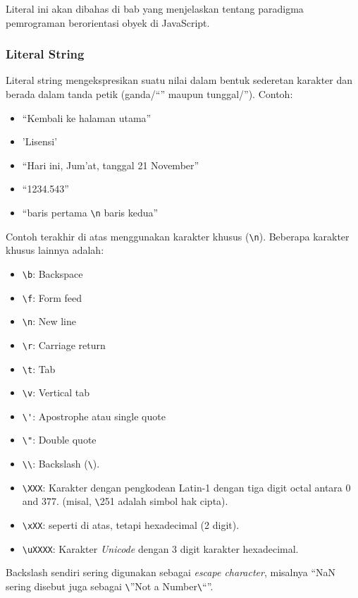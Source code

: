 Literal ini akan dibahas di bab yang menjelaskan tentang paradigma pemrograman berorientasi obyek di JavaScript.

\subsubsection{Literal String}

Literal string mengekspresikan suatu nilai dalam bentuk sederetan karakter dan berada dalam tanda petik (ganda/``'' maupun tunggal/''). Contoh:
\begin{itemize}
   \item ``Kembali ke halaman utama''
   \item 'Lisensi'
   \item ``Hari ini, Jum'at, tanggal 21 November''
   \item ``1234.543''
   \item ``baris pertama \verb+\n+ baris kedua''
 \end{itemize}

Contoh terakhir di atas menggunakan karakter khusus (\verb+\n+). Beberapa karakter khusus lainnya adalah:

\begin{itemize}
  \item \verb+\b+: Backspace
  \item \verb+\f+: Form feed
  \item \verb+\n+: New line
  \item \verb+\r+: Carriage return
  \item \verb+\t+: Tab
  \item \verb+\v+: Vertical tab
  \item \verb+\'+: Apostrophe atau single quote
  \item \verb+\"+: Double quote
  \item \verb+\\+:	Backslash (\verb+\+).
  \item \verb+\XXX+: Karakter dengan pengkodean Latin-1 dengan tiga digit octal antara 0 and 377. (misal, \verb+\+251 adalah simbol hak cipta).
  \item \verb+\xXX+: seperti di atas, tetapi hexadecimal (2 digit).
  \item \verb+\uXXXX+: Karakter \textit{Unicode} dengan 3 digit karakter hexadecimal.
\end{itemize}

Backslash sendiri sering digunakan sebagai \textit{escape character}, misalnya ``NaN sering disebut juga sebagai \verb+\+''Not a Number\verb+\+``''.

